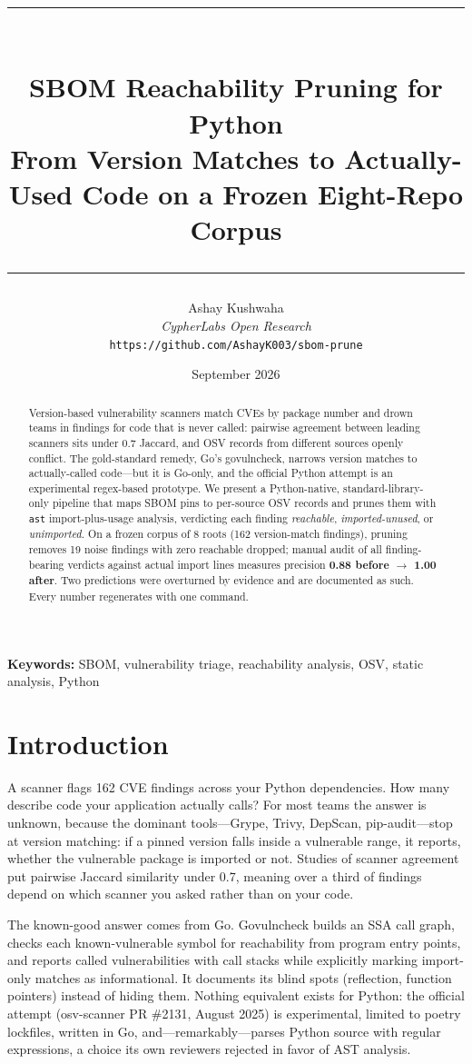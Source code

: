 \documentclass[11pt,a4paper]{article}
\title{
    \vspace{-2em}
    \rule{\textwidth}{1pt}\\[0.5em]
    \textbf{SBOM Reachability Pruning for Python}\\[0.3em]
    \large From Version Matches to Actually-Used Code on a Frozen Eight-Repo Corpus\\[0.5em]
    \rule{\textwidth}{1pt}
}
\author{
    Ashay Kushwaha\\
    \textit{CypherLabs Open Research}\\
    \texttt{https://github.com/AshayK003/sbom-prune}
}
\date{September 2026}
\begin{document}
\maketitle

\begin{abstract}
Version-based vulnerability scanners match CVEs by package number and drown teams in findings for code that is never called: pairwise agreement between leading scanners sits under 0.7 Jaccard, and OSV records from different sources openly conflict. The gold-standard remedy, Go's govulncheck, narrows version matches to actually-called code---but it is Go-only, and the official Python attempt is an experimental regex-based prototype. We present a Python-native, standard-library-only pipeline that maps SBOM pins to per-source OSV records and prunes them with \verb!ast! import-plus-usage analysis, verdicting each finding \textit{reachable}, \textit{imported-unused}, or \textit{unimported}. On a frozen corpus of 8 roots (162 version-match findings), pruning removes 19 noise findings with zero reachable dropped; manual audit of all finding-bearing verdicts against actual import lines measures precision \textbf{0.88 before $\to$ 1.00 after}. Two predictions were overturned by evidence and are documented as such. Every number regenerates with one command.
\end{abstract}

\vspace{1em}
\noindent\textbf{Keywords:} SBOM, vulnerability triage, reachability analysis, OSV, static analysis, Python

\newpage
\tableofcontents
\newpage

\section{Introduction}

A scanner flags 162 CVE findings across your Python dependencies. How many describe code your application actually calls? For most teams the answer is unknown, because the dominant tools---Grype, Trivy, DepScan, pip-audit---stop at version matching: if a pinned version falls inside a vulnerable range, it reports, whether the vulnerable package is imported or not. Studies of scanner agreement put pairwise Jaccard similarity under 0.7, meaning over a third of findings depend on which scanner you asked rather than on your code.

The known-good answer comes from Go. Govulncheck builds an SSA call graph, checks each known-vulnerable symbol for reachability from program entry points, and reports called vulnerabilities with call stacks while explicitly marking import-only matches as informational. It documents its blind spots (reflection, function pointers) instead of hiding them. Nothing equivalent exists for Python: the official attempt (osv-scanner PR \#2131, August 2025) is experimental, limited to poetry lockfiles, written in Go, and---remarkably---parses Python source with regular expressions, a choice its own reviewers rejected in favor of AST analysis.
\end{document}
